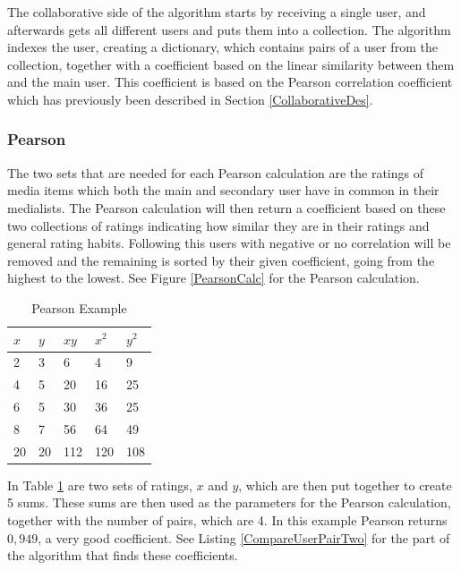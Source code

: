 The collaborative side of the algorithm starts by receiving a single user, and afterwards gets all different users and puts them into a collection. The algorithm indexes the user, creating a dictionary, which contains pairs of a user from the collection, together with a coefficient based on the linear similarity between them and the main user. This coefficient is based on the Pearson correlation coefficient which has previously been described in Section \ref{CollaborativeDes}.

\subsubsection{Pearson}

The two sets that are needed for each Pearson calculation are the ratings of media items which both the main and secondary user have in common in their medialists. The Pearson calculation will then return a coefficient based on these two collections of ratings indicating how similar they are in their ratings and general rating habits. Following this users with negative or no correlation will be removed and the remaining is sorted by their given coefficient, going from the highest to the lowest. See Figure \ref{PearsonCalc} for the Pearson calculation.

\begin{table}[htb]
\centering
\begin{tabular}{|l|l|l|l|l|} \hline
	\textbf{$x$} & \textbf{$y$} & \textbf{$xy$}
	& \textbf{$x^2$} & \textbf{$y^2$} \\ \hline
	2 & 3 & 6 & 4 & 9 \\ \hline
	4 & 5 & 20 & 16 & 25 \\ \hline
	6 & 5 & 30 & 36 & 25 \\ \hline
	8 & 7 & 56 & 64 & 49 \\ \hline\hline
	20 & 20 & 112 & 120 & 108 \\ \hline
\end{tabular}
\caption{Pearson Example}
\label{PearsonEx}
\end{table} 

In Table \ref{PearsonEx} are two sets of ratings, $x$ and $y$, which are then put together to create 5 sums. These sums are then used as the parameters for the Pearson calculation, together with the number of pairs, which are 4. In this example Pearson returns $0,949$, a very good coefficient. See Listing \ref{CompareUserPairTwo} for the part of the algorithm that finds these coefficients.\\


